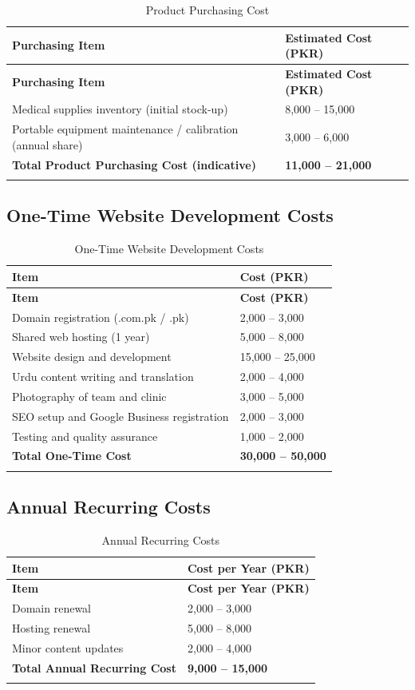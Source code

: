 \documentclass[12pt, a4paper]{article}
\begin{document}
\begin{longtable}{@{} L{9cm} R{5.4cm} @{}}
\toprule
\textbf{Purchasing Item} & \textbf{Estimated Cost (PKR)} \\
\midrule
\endfirsthead
\toprule
\textbf{Purchasing Item} & \textbf{Estimated Cost (PKR)} \\
\midrule
\endhead
Medical supplies inventory (initial stock-up) & 8,000 -- 15,000 \\[4pt]
Portable equipment maintenance / calibration (annual share) & 3,000 -- 6,000 \\
\midrule
\textbf{Total Product Purchasing Cost (indicative)} & \textbf{11,000 -- 21,000} \\
\bottomrule
\caption{Product Purchasing Cost}
\end{longtable}

\subsection{One-Time Website Development Costs}

\begin{longtable}{@{} L{9cm} R{5.4cm} @{}}
\toprule
\textbf{Item} & \textbf{Cost (PKR)} \\
\midrule
\endfirsthead
\toprule
\textbf{Item} & \textbf{Cost (PKR)} \\
\midrule
\endhead
Domain registration (.com.pk / .pk) & 2,000 – 3,000 \\[4pt]
Shared web hosting (1 year) & 5,000 – 8,000 \\[4pt]
Website design and development & 15,000 – 25,000 \\[4pt]
Urdu content writing and translation & 2,000 – 4,000 \\[4pt]
Photography of team and clinic & 3,000 – 5,000 \\[4pt]
SEO setup and Google Business registration & 2,000 – 3,000 \\[4pt]
Testing and quality assurance & 1,000 – 2,000 \\
\midrule
\textbf{Total One-Time Cost} & \textbf{30,000 – 50,000} \\
\bottomrule
\caption{One-Time Website Development Costs}
\end{longtable}

\subsection{Annual Recurring Costs}

\begin{longtable}{@{} L{9cm} R{5.4cm} @{}}
\toprule
\textbf{Item} & \textbf{Cost per Year (PKR)} \\
\midrule
\endfirsthead
\toprule
\textbf{Item} & \textbf{Cost per Year (PKR)} \\
\midrule
\endhead
Domain renewal & 2,000 – 3,000 \\[4pt]
Hosting renewal & 5,000 – 8,000 \\[4pt]
Minor content updates & 2,000 – 4,000 \\
\midrule
\textbf{Total Annual Recurring Cost} & \textbf{9,000 – 15,000} \\
\bottomrule
\caption{Annual Recurring Costs}
\end{longtable}
\end{document}
